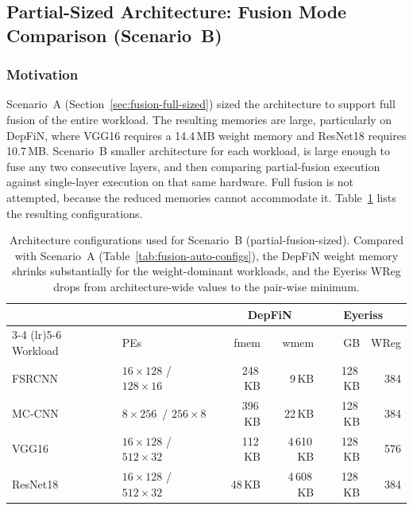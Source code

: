 \subsection{Partial-Sized Architecture: Fusion Mode Comparison
  (Scenario~B)}
\label{sec:fusion-partial-sized}

\subsubsection{Motivation}

Scenario~A (Section~\ref{sec:fusion-full-sized}) sized the
architecture to support full fusion of the entire workload.
The resulting memories are large, particularly on DepFiN, where
VGG16 requires a 14.4\,MB weight memory and ResNet18 requires
10.7\,MB.
Scenario~B smaller architecture for
each workload, is large enough to fuse any two consecutive
layers, and then comparing partial-fusion execution against
single-layer execution on that same hardware.
Full fusion is not attempted, because the reduced memories
cannot accommodate it.
Table~\ref{tab:partial-sized-configs} lists the resulting
configurations.

\begin{table}[htbp]
  \centering
  \caption{Architecture configurations used for Scenario~B
    (partial-fusion-sized).
    Compared with Scenario~A
    (Table~\ref{tab:fusion-auto-configs}), the DepFiN weight
    memory shrinks substantially for the weight-dominant
    workloads, and the Eyeriss WReg drops from architecture-wide
    values to the pair-wise minimum.}
  \label{tab:partial-sized-configs}
  \begin{tabular}{ll rr rr}
    \toprule
    & & \multicolumn{2}{c}{DepFiN} & \multicolumn{2}{c}{Eyeriss} \\
    \cmidrule(lr){3-4} \cmidrule(lr){5-6}
    Workload & PEs
      & fmem & wmem
      & GB & WReg \\
    \midrule
    FSRCNN   & $16 \times 128$ / $128 \times 16$
      & 248\,KB  & 9\,KB
      & 128\,KB  & 384 \\
    MC-CNN   & $8 \times 256$\, / $256 \times 8$
      & 396\,KB  & 22\,KB
      & 128\,KB  & 384 \\
    VGG16    & $16 \times 128$ / $512 \times 32$
      & 112\,KB  & 4\,610\,KB
      & 128\,KB  & 576 \\
    ResNet18 & $16 \times 128$ / $512 \times 32$
      & 48\,KB   & 4\,608\,KB
      & 128\,KB  & 384 \\
    \bottomrule
  \end{tabular}
\end{table}

